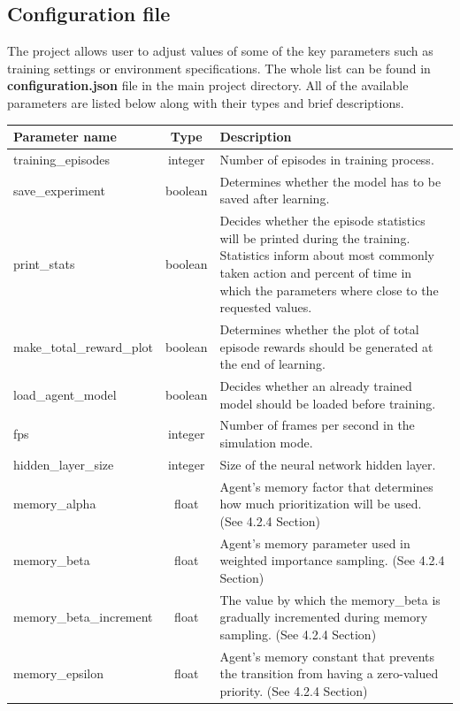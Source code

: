 \documentclass{article}
\begin{document}
\subsection{Configuration file}
The project allows user to adjust values of some of the key parameters such as training settings or environment specifications. The whole list can be found in \textbf{configuration.json} file in the main project directory. All of the available parameters are listed below along with their types and brief descriptions.
{\def\arraystretch{1.2}\tabcolsep=5pt
\begin{longtable}{l|c|p{9cm}}
	\hline
	\textbf{Parameter name} & \textbf{Type} & \textbf{Description} \\
	\hline
    training\_episodes & integer & Number of episodes in training process.\\
    \hline
    save\_experiment & boolean & Determines whether the model has to be saved after learning.\\
    \hline
    print\_stats & boolean & Decides whether the episode statistics will be printed during the training. Statistics inform about most commonly taken action and percent of time in which the parameters where close to the requested values.\\
    \hline
    make\_total\_reward\_plot & boolean & Determines whether the plot of total episode rewards should be generated at the end of learning.\\
    \hline
    load\_agent\_model & boolean & Decides whether an already trained model should be loaded before training.\\
    \hline
    fps & integer & Number of frames per second in the simulation mode.\\
    \hline
    hidden\_layer\_size & integer & Size of the neural network hidden layer.\\
    \hline
    memory\_alpha & float & Agent's memory factor that determines how much prioritization will be used. (See 4.2.4 Section)\\
    \hline
    memory\_beta & float & Agent's memory parameter used in weighted importance sampling. (See 4.2.4 Section)\\
    \hline
    memory\_beta\_increment & float & The value by which the memory\_beta is gradually incremented during memory sampling. (See 4.2.4 Section)\\
    \hline
    memory\_epsilon & float & Agent's memory constant that prevents the transition from having a zero-valued priority. (See 4.2.4 Section)\\

\end{longtable}}
\end{document}
